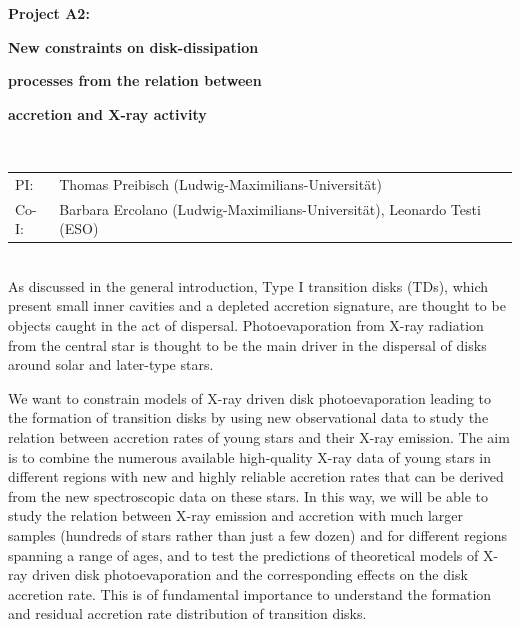 \documentclass[10pt,fleqn,twoside]{article}
\begin{document}
\newpage


\setcounter{page}{1}

\centerline{\huge\bf\Tcol
%
%
%
%
%
 Project A2:}
\vspace{1em}

\centerline{\LARGE\bf\Tcol New constraints on disk-dissipation}\vspace{0.3em}
\centerline{\LARGE\bf\Tcol processes from the relation between}\vspace{0.3em}
\centerline{\LARGE\bf\Tcol  accretion and  X-ray activity}

%
%
%
%
%
\vskip1.0cm


\\
\begin{tabular}{ll}
{\textsf{PI:}}                   & Thomas Preibisch (Ludwig-Maximilians-Universit\"at) \\
{\textsf{Co-I:}}                & Barbara Ercolano (Ludwig-Maximilians-Universit\"at), Leonardo Testi (ESO)\\
\end{tabular}


\vspace{1em}

\vspace{1em}
\\
As discussed in the general introduction, Type I transition disks
(TDs), which present small inner cavities and a depleted accretion
signature, are thought to be objects caught in the act of
dispersal. Photoevaporation from X-ray radiation from the central
star is thought to be the main driver in the dispersal of disks around
solar and later-type stars. 

We want to constrain models of X-ray driven disk photoevaporation leading
to the formation of transition disks by using
new observational data to study the relation between accretion rates of young stars and
their X-ray emission.
The aim is to combine the numerous available high-quality
X-ray data of young stars  in different regions with new and highly reliable 
accretion rates that can be derived from the new spectroscopic data on these stars.
In this way, we will be able to study the relation between X-ray emission
and accretion with much larger samples (hundreds of stars rather
than just a few dozen) and for different regions spanning a range
of ages, and to test the predictions of theoretical models of
X-ray driven disk photoevaporation and the corresponding effects on
the disk accretion rate. This is of fundamental importance to
understand the formation and residual accretion rate distribution of
transition disks. 
\end{document}
